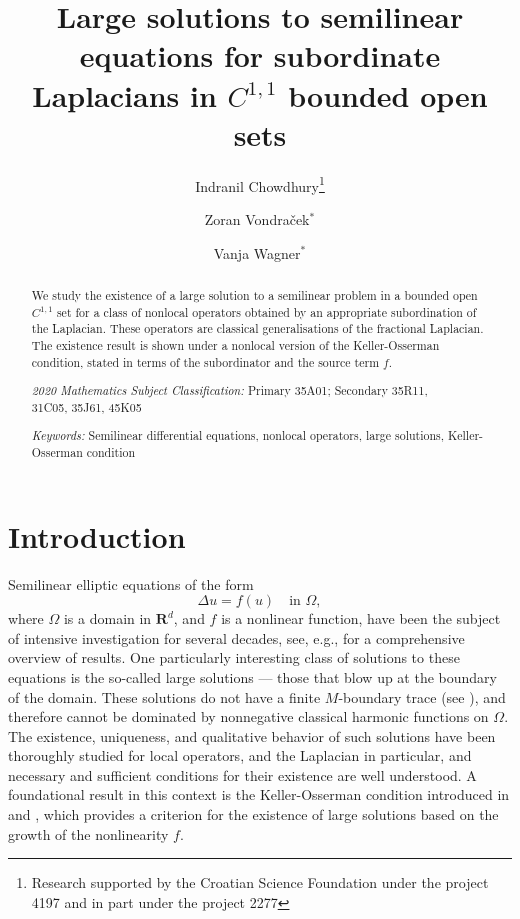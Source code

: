 \documentclass[a4paper,12pt,draft]{article}
\theoremstyle{plain}
\theoremstyle{definition}
\numberwithin{equation}{section}
\newcommand{\1}{1}
\begin{document}
\allowdisplaybreaks

\title{\Large\bfseries Large solutions to semilinear equations for subordinate Laplacians in $C^{1,1}$ bounded open sets}

\author{ Indranil Chowdhury\footnote{ Research supported by the Croatian Science Foundation under the project 4197 and in part under the project 2277 }
    \and
    Zoran Vondra\v cek$^\ast$
    \and
    Vanja Wagner$^\ast$
}

\date{}

\maketitle

 \begin{abstract}\noindent
  We study the existence of a large solution to a semilinear problem in a bounded open $C^{1,1}$ set for a class of nonlocal operators obtained by an appropriate subordination of the Laplacian. These operators are classical generalisations of the fractional Laplacian. The existence result is shown under a nonlocal version of the Keller-Osserman condition, stated in terms of the subordinator and the source term $f$. 

      \medskip
      \noindent
      \emph{2020 Mathematics Subject Classification:} Primary 35A01; Secondary 35R11,\\ 31C05, 35J61, 45K05 
      
      \medskip\noindent
      \emph{Keywords:} Semilinear differential equations, nonlocal operators, large solutions, Keller-Osserman condition
  \end{abstract}


 

\section{Introduction}\label{sec-INTRO}

Semilinear elliptic equations of the form
\[
\Delta u = f(u) \quad \text{in } \Omega,
\]
where \(\Omega\) is a domain in \(\mathbf{R}^d\), and \(f\) is a nonlinear function, have been the subject of intensive investigation for several decades, see, e.g., \cite{MV} for a comprehensive overview of results. One particularly interesting class of solutions to these equations is the so-called large solutions — those that blow up at the boundary of the domain. These solutions do not have a finite $M$-boundary trace (see \cite[Definition 1.3.6.]{MV}), and therefore cannot be dominated by nonnegative classical harmonic functions on $\Omega$. The existence, uniqueness, and qualitative behavior of such solutions have been thoroughly studied for local operators, and the Laplacian in particular, and necessary and sufficient conditions for their existence are well understood. A foundational result in this context is the Keller-Osserman condition introduced in \cite{keller} and \cite{osserman}, which provides a criterion for the existence of large solutions based on the growth of the nonlinearity \(f\).
\end{document}
